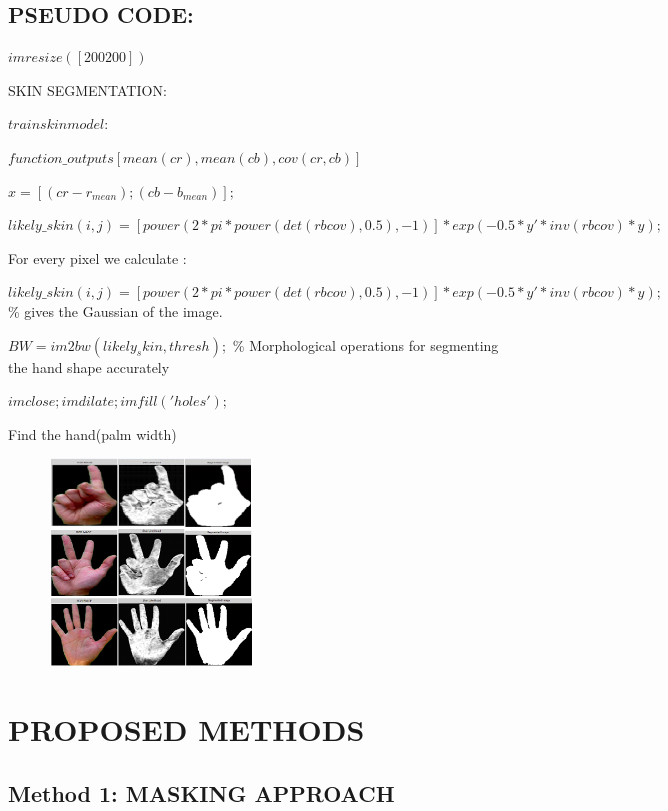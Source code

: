 \documentclass[conference]{IEEEtran}
\begin{document}
\subsection{PSEUDO CODE:}
\begin{flushleft}
$imresize([200 200])$ 

SKIN SEGMENTATION:

$train skin model : $

$function\_outputs[ mean(cr) ,mean(cb), cov(cr,cb)]$

$x = [(cr-r_{mean});(cb-b_{mean})];$

$likely\_skin(i,j) = [power(2*pi*power(det(rbcov),0.5),-1)]*exp(-0.5* y'*inv(rbcov)* y);$

For every pixel we calculate :

$likely\_skin(i,j) = [power(2*pi*power(det(rbcov),0.5),-1)]*exp(-0.5*y'*inv(rbcov)*y);$ \% gives the Gaussian of the image. 

$BW = im2bw(likely_skin,thresh); $ \% Morphological operations for segmenting the hand shape accurately

$imclose;imdilate;imfill('holes');$

Find the hand(palm width) 
\end{flushleft}
\begin{figure}[h!]
	\centering
	\includegraphics[width = 5.5cm, height = 5.5cm]{grid1}
\end{figure}



\section{PROPOSED METHODS}

\subsection{Method 1: MASKING APPROACH }
\end{document}
